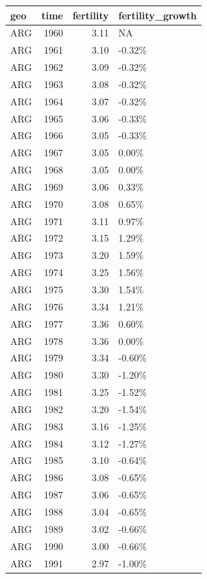 \documentclass[
]{article}
\begin{document}
\begin{tabular}{l|r|r|l}
\hline
geo & time & fertility & fertility\_growth\\
\hline
ARG & 1960 & 3.11 & NA\\
\hline
ARG & 1961 & 3.10 & -0.32\%\\
\hline
ARG & 1962 & 3.09 & -0.32\%\\
\hline
ARG & 1963 & 3.08 & -0.32\%\\
\hline
ARG & 1964 & 3.07 & -0.32\%\\
\hline
ARG & 1965 & 3.06 & -0.33\%\\
\hline
ARG & 1966 & 3.05 & -0.33\%\\
\hline
ARG & 1967 & 3.05 & 0.00\%\\
\hline
ARG & 1968 & 3.05 & 0.00\%\\
\hline
ARG & 1969 & 3.06 & 0.33\%\\
\hline
ARG & 1970 & 3.08 & 0.65\%\\
\hline
ARG & 1971 & 3.11 & 0.97\%\\
\hline
ARG & 1972 & 3.15 & 1.29\%\\
\hline
ARG & 1973 & 3.20 & 1.59\%\\
\hline
ARG & 1974 & 3.25 & 1.56\%\\
\hline
ARG & 1975 & 3.30 & 1.54\%\\
\hline
ARG & 1976 & 3.34 & 1.21\%\\
\hline
ARG & 1977 & 3.36 & 0.60\%\\
\hline
ARG & 1978 & 3.36 & 0.00\%\\
\hline
ARG & 1979 & 3.34 & -0.60\%\\
\hline
ARG & 1980 & 3.30 & -1.20\%\\
\hline
ARG & 1981 & 3.25 & -1.52\%\\
\hline
ARG & 1982 & 3.20 & -1.54\%\\
\hline
ARG & 1983 & 3.16 & -1.25\%\\
\hline
ARG & 1984 & 3.12 & -1.27\%\\
\hline
ARG & 1985 & 3.10 & -0.64\%\\
\hline
ARG & 1986 & 3.08 & -0.65\%\\
\hline
ARG & 1987 & 3.06 & -0.65\%\\
\hline
ARG & 1988 & 3.04 & -0.65\%\\
\hline
ARG & 1989 & 3.02 & -0.66\%\\
\hline
ARG & 1990 & 3.00 & -0.66\%\\
\hline
ARG & 1991 & 2.97 & -1.00\%\\

\end{tabular}
\end{document}
